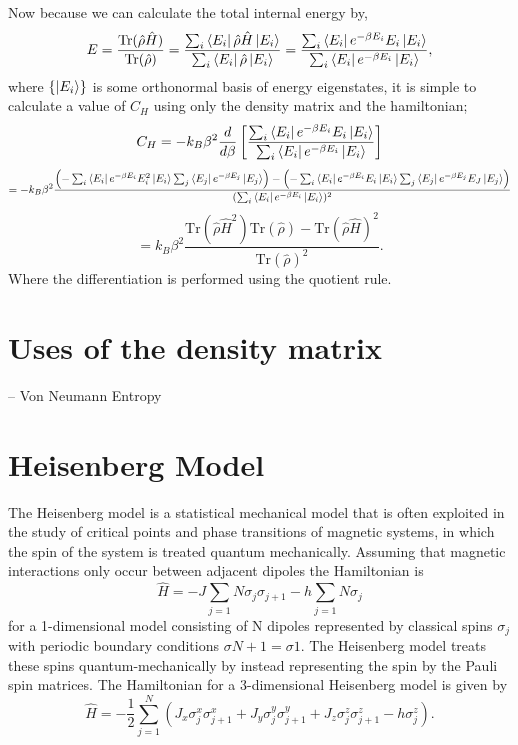 \documentclass[12pt,a4paper]{article}
\begin{document}
Now because we can calculate the total internal energy by,
\begin{equation}
E = \frac{\mbox{Tr}(\hat{\rho}\hat{H})}{\mbox{Tr}(\hat{\rho})} = \frac{\sum_{i}\bra{E_i}\hat{\rho}\hat{H}\ket{E_i}}{\sum_{i}\bra{E_i}\hat{\rho}\ket{E_i}} 
= \frac{\sum_{i}\bra{E_i}e^{-\beta E_i}E_i\ket{E_i}}{\sum_{i}\bra{E_i}e^{-\beta E_i}\ket{E_i}}
,
\end{equation}
where $\{\ket{E_i}\}$ is some orthonormal basis of energy eigenstates, it is simple to calculate a value of $C_H$ using only the density matrix and the hamiltonian;
\newpage
\begin{equation}
C_H =  -k_{B}\beta^2\frac{d}{d\beta}\left[ \frac{\sum_{i}\bra{E_i}e^{-\beta E_i}E_i\ket{E_i}}{\sum_{i}\bra{E_i}e^{-\beta E_i}\ket{E_i}} \right] 
\end{equation}
\begin{equation}
= -k_{B}\beta^2\frac{\left(-\sum_{i}\bra{E_i}e^{-\beta E_i}E_i^2\ket{E_i} \sum_{j}\bra{E_j}e^{-\beta E_j}\ket{E_j}\right)-\left(-\sum_{i}\bra{E_i}e^{-\beta E_i}E_i\ket{E_i} \sum_{j}\bra{E_j}e^{-\beta E_j}E_J\ket{E_j}\right)}{(\sum_{i}\bra{E_i}e^{-\beta E_i}\ket{E_i})^2} 
\end{equation}
\begin{equation}
= k_B\beta^2\frac{\mbox{Tr}(\hat{\rho}\hat{H}^2)\mbox{Tr}(\hat{\rho})-\mbox{Tr}(\hat{\rho}\hat{H})^2}{\mbox{Tr}(\hat{\rho})^2}.
\end{equation}
Where the differentiation is performed using the quotient rule.

\section{Uses of the density matrix}
-- Von Neumann Entropy
\section{Heisenberg Model}
The Heisenberg model is a statistical mechanical model that is often exploited in the study of critical points and phase transitions of magnetic systems, in which the spin of the system is treated quantum mechanically. Assuming that magnetic interactions only occur between adjacent dipoles the Hamiltonian is
\begin{equation}
\hat{H} = -J\sum_{j=1}{N}\sigma_j\sigma_{j+1}-h\sum_{j=1}{N}\sigma_j
\label{eq:classicalSpinHamiltonian}
\end{equation}
for a 1-dimensional model consisting of N dipoles represented by classical spins $\sigma_j$ with periodic boundary conditions $\sigma{N+1}=\sigma{1}$. The Heisenberg model treats these spins quantum-mechanically by instead representing the spin by the Pauli spin matrices. The Hamiltonian for a 3-dimensional Heisenberg model is given by
\begin{equation}
\label{3dHeisenburgHamiltonian}
\hat{H}=-\frac{1}{2}\sum_{j=1}^{N}\left(J_x\sigma^x_j\sigma^x_{j+1}+J_y\sigma^y_j\sigma^y_{j+1}+J_z\sigma^z_j\sigma^z_{j+1}-h\sigma^z_j\right).
\end{equation}
\end{document}
